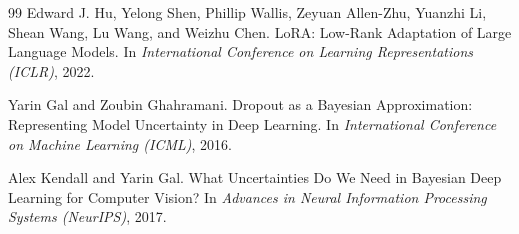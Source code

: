 \documentclass[12pt, a4paper]{ctexart}
\begin{document}
\begin{thebibliography}{99}
Edward J. Hu, Yelong Shen, Phillip Wallis, Zeyuan Allen-Zhu, Yuanzhi Li, Shean Wang, Lu Wang, and Weizhu Chen.
\newblock LoRA: Low-Rank Adaptation of Large Language Models.
\newblock In \emph{International Conference on Learning Representations (ICLR)}, 2022.

Yarin Gal and Zoubin Ghahramani.
\newblock Dropout as a Bayesian Approximation: Representing Model Uncertainty in Deep Learning.
\newblock In \emph{International Conference on Machine Learning (ICML)}, 2016.

Alex Kendall and Yarin Gal.
\newblock What Uncertainties Do We Need in Bayesian Deep Learning for Computer Vision?
\newblock In \emph{Advances in Neural Information Processing Systems (NeurIPS)}, 2017.
\end{thebibliography}
\end{document}
